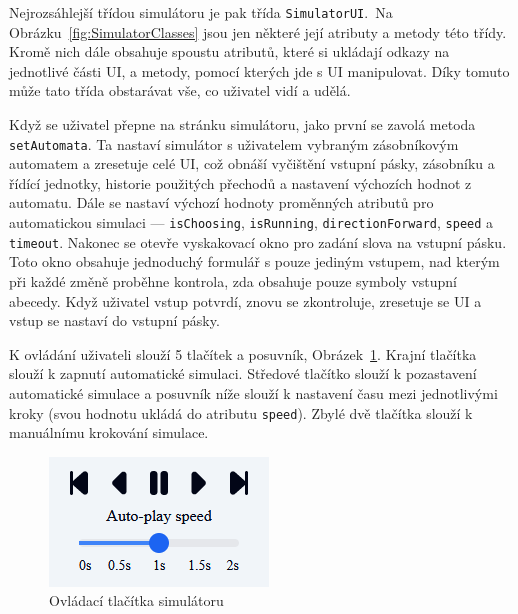 Nejrozsáhlejší třídou simulátoru je pak třída \texttt{SimulatorUI}.\ Na Obrázku~\ref{fig:SimulatorClasses} jsou jen některé její atributy a metody této třídy. Kromě nich dále obsahuje spoustu atributů, které si ukládají odkazy na jednotlivé části UI, a metody, pomocí kterých jde s UI manipulovat. Díky tomuto může tato třída obstarávat vše, co uživatel vidí a udělá.

Když se uživatel přepne na stránku simulátoru, jako první se zavolá metoda \texttt{setAutomata}. Ta nastaví simulátor s uživatelem vybraným zásobníkovým automatem a zresetuje celé UI, což obnáší vyčištění vstupní pásky, zásobníku a řídící jednotky, historie použitých přechodů a nastavení výchozích hodnot z automatu. Dále se nastaví výchozí hodnoty proměnných atributů pro automatickou simulaci --- \texttt{isChoosing}, \texttt{isRunning}, \texttt{directionForward}, \texttt{speed} a \texttt{timeout}. Nakonec se otevře vyskakovací okno pro zadání slova na vstupní pásku. Toto okno obsahuje jednoduchý formulář s pouze jediným vstupem, nad kterým při každé změně proběhne kontrola, zda obsahuje pouze symboly vstupní abecedy. Když uživatel vstup potvrdí, znovu se zkontroluje, zresetuje se UI a vstup se nastaví do vstupní pásky.

K ovládání uživateli slouží 5 tlačítek a posuvník, Obrázek~\ref{fig:SimulatorButtons}. Krajní tlačítka slouží k zapnutí automatické simulaci. Středové tlačítko slouží k pozastavení automatické simulace a posuvník níže slouží k nastavení času mezi jednotlivými kroky (svou hodnotu ukládá do atributu \texttt{speed}). Zbylé dvě tlačítka slouží k manuálnímu krokování simulace.

\begin{figure}[h]
    \centering
    \includegraphics{Figures/PrntScrn_SimulatorButtons.png}
    \caption{Ovládací tlačítka simulátoru}\label{fig:SimulatorButtons}
\end{figure}

